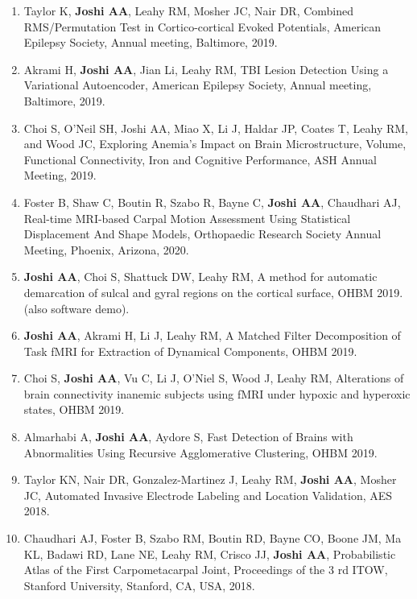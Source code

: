 \documentclass[overlapped,line,letterpaper]{res}
\begin{document}
\begin{resume}
\begin{enumerate}
    \item Taylor K, \textbf{Joshi AA}, Leahy RM, Mosher JC, Nair DR, Combined RMS/Permutation Test in Cortico-cortical Evoked Potentials, American Epilepsy Society, Annual meeting, Baltimore, 2019.

    \item Akrami H, \textbf{Joshi AA}, Jian Li, Leahy RM, {TBI Lesion Detection Using a Variational Autoencoder}, American Epilepsy Society, Annual meeting, Baltimore, 2019.

    \item Choi S, O'Neil SH, Joshi AA, Miao X, Li J, Haldar JP, Coates T, Leahy RM, and Wood JC, {Exploring Anemia’s Impact on Brain Microstructure, Volume, Functional Connectivity, Iron and Cognitive Performance}, ASH Annual Meeting, 2019.

    \item Foster B, Shaw C, Boutin R, Szabo R, Bayne C, \textbf{Joshi AA}, Chaudhari AJ, {Real-time MRI-based Carpal Motion Assessment Using Statistical Displacement And Shape Models}, Orthopaedic Research Society Annual Meeting, Phoenix, Arizona, 2020.

    \item \textbf{Joshi AA}, Choi S, Shattuck DW, Leahy RM, {A method for automatic demarcation of sulcal and gyral regions on the cortical surface}, OHBM 2019. (also software demo).

    \item \textbf{Joshi AA}, Akrami H, Li J, Leahy RM, {A Matched Filter Decomposition of Task fMRI for Extraction of Dynamical Components}, OHBM 2019.

    \item Choi S, \textbf{Joshi AA}, Vu C, Li J, O'Niel S, Wood J, Leahy RM, {Alterations of brain connectivity inanemic subjects using fMRI under hypoxic and hyperoxic states}, OHBM 2019.

    \item Almarhabi A, \textbf{Joshi AA}, Aydore S, {Fast Detection of Brains with Abnormalities Using Recursive Agglomerative Clustering}, OHBM 2019.

    \item Taylor KN, Nair DR, Gonzalez-Martinez J, Leahy RM, \textbf{Joshi AA}, Mosher JC, {Automated Invasive Electrode Labeling and Location Validation}, AES 2018. 

    \item Chaudhari AJ, Foster B, Szabo RM, Boutin RD, Bayne CO, Boone JM, Ma KL, Badawi RD, Lane NE, Leahy RM, Crisco JJ, \textbf{Joshi AA}, {Probabilistic Atlas of the First Carpometacarpal Joint}, Proceedings of the 3 rd ITOW, Stanford University, Stanford, CA, USA, 2018.


\end{enumerate}
\end{resume}
\end{document}
